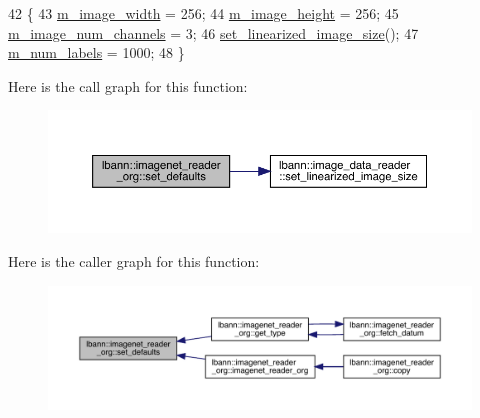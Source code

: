 \begin{DoxyCode}
42                                        \{
43   \hyperlink{classlbann_1_1image__data__reader_af001f3d1c0f1c580b66988233b3a64f0}{m\_image\_width} = 256;
44   \hyperlink{classlbann_1_1image__data__reader_a0632efa3deaa9d61e671f741909eb3fe}{m\_image\_height} = 256;
45   \hyperlink{classlbann_1_1image__data__reader_aab1a440f361521dc7bd583cefe1061f8}{m\_image\_num\_channels} = 3;
46   \hyperlink{classlbann_1_1image__data__reader_a0164b0e3abbe92daef73b36fb925403e}{set\_linearized\_image\_size}();
47   \hyperlink{classlbann_1_1image__data__reader_af280e8758a6ec3acee7c62e6351d17e0}{m\_num\_labels} = 1000;
48 \}
\end{DoxyCode}
Here is the call graph for this function\+:\nopagebreak
\begin{figure}[H]
\begin{center}
\leavevmode
\includegraphics[width=350pt]{classlbann_1_1imagenet__reader__org_af0d9fc9081013ef0ddd3222dfd9abb8b_cgraph}
\end{center}
\end{figure}
Here is the caller graph for this function\+:\nopagebreak
\begin{figure}[H]
\begin{center}
\leavevmode
\includegraphics[width=350pt]{classlbann_1_1imagenet__reader__org_af0d9fc9081013ef0ddd3222dfd9abb8b_icgraph}
\end{center}
\end{figure}
\mbox{\label{classlbann_1_1imagenet__reader__org_afb843084789c6a12e01a5d4a687003cf}} 

